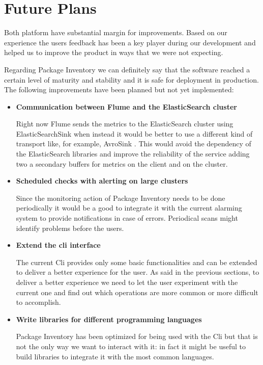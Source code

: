 \section{Future Plans}

Both platform have substantial margin for improvements. Based on our
experience the users feedback has been a key player during our development
and helped us to improve the product in ways that we were not expecting.

Regarding Package Inventory we can definitely say that the software
reached a certain level of maturity and stability and it is safe for
deployment in production. The following improvements have been planned but
not yet implemented:

\begin{itemize}

  \item \textbf{Communication between Flume and the ElasticSearch cluster}

  Right now Flume sends the metrics to the ElasticSearch cluster using
  ElasticSearchSink \cite{elasticSearchSink} when instead it would be
  better to use a different kind of transport like, for example, AvroSink
  \cite{avroSink}. This would avoid the dependency of the ElasticSearch
  libraries and improve the reliability of the service adding two
  a secondary buffers for metrics on the client and on the cluster.

  \item \textbf{Scheduled checks with alerting on large clusters}

  Since the monitoring action of Package Inventory needs to be done
  periodically it would be a good to integrate it with the current
  alarming system to provide notifications in case of errors. Periodical
  scans might identify problems before the users.

  \item \textbf{Extend the cli interface}

  The current Cli provides only some basic functionalities and can be
  extended to deliver a better experience for the user. As said in the
  previous sections, to deliver a better experience we need to let the
  user experiment with the current one and find out which operations are
  more common or more difficult to accomplish.

  \item \textbf{Write libraries for different programming languages}

  Package Inventory has been optimized for being used with the Cli but
  that is not the only way we want to interact with it: in fact it might
  be useful to build libraries to integrate it with the most common
  languages.


\end{itemize}
